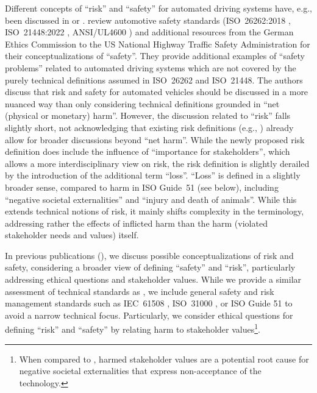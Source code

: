 Different concepts of ``risk'' and ``safety'' for automated driving systems have, e.g., been discussed in \parencite{koopman2024} or \parencite{salem2024}.
\citeauthor{koopman2024} \parencite{koopman2024} review automotive safety standards (ISO~26262:2018 \parencite{iso2018}, ISO~21448:2022 \parencite{iso21448}, ANSI/UL4600 \parencite{ul4600}) and additional resources from the German Ethics Commission \parencite{difabio2017} to the US National Highway Traffic Safety Administration for their conceptualizations of ``safety''.
They provide additional examples of ``safety problems'' related to automated driving systems which are not covered by the purely technical definitions assumed in ISO~26262 and ISO~21448.
The authors discuss that risk and safety for automated vehicles should be discussed in a more nuanced way than only considering technical definitions grounded in ``net (physical or monetary) harm''.
However, the discussion related to ``risk'' falls slightly short, not acknowledging that existing risk definitions (e.g., \parencite{fischhoff1984,renn1998}) already allow for broader discussions beyond ``net harm''.
While the newly proposed risk definition does include the influence of ``importance for stakeholders'', which allows a more interdisciplinary view on risk, the risk definition is slightly derailed by the introduction of the additional term ``loss''.
``Loss'' is defined in a slightly broader sense, compared to harm in ISO Guide~51 (see below), including ``negative societal externalities'' and ``injury and death of animals''.
While this extends technical notions of risk, it mainly shifts complexity in the terminology, addressing rather the effects of inflicted harm than the harm (violated stakeholder needs and values) itself.

In previous publications (\parencite{salem2024, nolte2024}), we discuss possible conceptualizations of risk and safety, considering a broader view of defining ``safety'' and ``risk'', particularly addressing ethical questions and stakeholder values.
While we provide a similar assessment of technical standards as \citeauthor{koopman2024}, we include general safety and risk management standards such as IEC~61508 \parencite{iec61508}, ISO~31000 \parencite{iso31000}, or ISO Guide 51 \parencite{iso51} to avoid a narrow technical focus.
Particularly, we consider ethical questions for defining ``risk'' and ``safety'' by relating harm to stakeholder values\footnote{When compared to \citeauthor{koopman2024}, harmed stakeholder values are a potential root cause for negative societal externalities that express non-acceptance of the technology.}.

